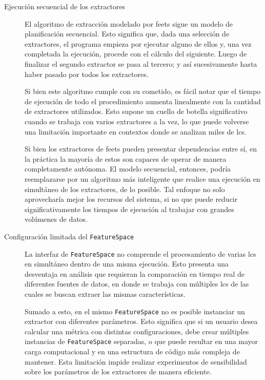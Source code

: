 \begin{description}
 \item[Ejecución secuencial de los extractores]
    El algoritmo de extracción modelado por \gls{feets} sigue un modelo de planificación secuencial. Esto significa que, dada una selección de extractores, el programa empieza por ejecutar alguno de ellos y, una vez completada la ejecución, procede con el cálculo del siguiente. Luego de finalizar el segundo extractor se pasa al tercero; y así sucesivamente hasta haber pasado por todos los extractores.
    
    Si bien este algoritmo cumple con su cometido, es fácil notar que el tiempo de ejecución de todo el procedimiento aumenta linealmente con la cantidad de extractores utilizados. Esto supone un cuello de botella significativo cuando se trabaja con varios extractores a la vez, lo que puede volverse una limitación importante en contextos donde se analizan miles de \glspl{lc}.
    
    Si bien los extractores de \gls{feets} pueden presentar dependencias entre sí, en la práctica la mayoría de estos son capaces de operar de manera completamente autónoma. El modelo secuencial, entonces, podría reemplazarse por un algoritmo más inteligente que realice una ejecución en simultáneo de los extractores, de lo posible. Tal enfoque no solo aprovecharía mejor los recursos del sistema, si no que puede reducir significativamente los tiempos de ejecución al trabajar con grandes volúmenes de datos.

    \item[Configuración limitada del \texttt{FeatureSpace}] 
    La interfaz de \texttt{FeatureSpace} no comprende el procesamiento de varias \glspl{lc} en simultáneo dentro de una misma ejecución. Esto presenta una desventaja en análisis que requieran la comparación en tiempo real de diferentes fuentes de datos, en donde se trabaja con múltiples \glspl{lc} de las cuales se buscan extraer las mismas características.

    Sumado a esto, en el mismo \texttt{FeatureSpace} no es posible instanciar un extractor con diferentes parámetros. Esto significa que si un usuario desea calcular una métrica con distintas configuraciones, debe crear múltiples instancias de \texttt{FeatureSpace} separadas, o que puede resultar en una mayor carga computacional y en una estructura de código más compleja de mantener. Esta limitación impide realizar experimentos de sensibilidad sobre los parámetros de los extractores de manera eficiente.


\end{description}
